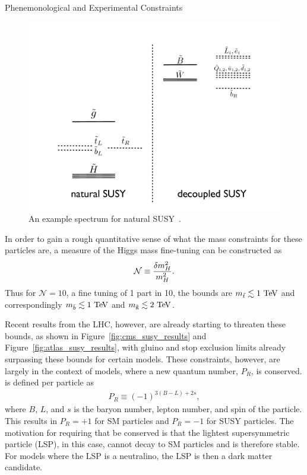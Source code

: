 \begin{section}{Phenemonological and Experimental Constraints}
\begin{figure}[tbp!]
\begin{center}
\includegraphics[angle=0,width=0.60\columnwidth]{fig/natural_susy_spectrum.png}
\end{center}
\caption{An example spectrum for natural SUSY~\cite{Papucci:2011wy}.}
\label{fig:natural_susy_spectrum}
\end{figure}

In order to gain a rough quantitative sense of what the mass constraints for these particles are, a measure of the Higgs mass fine-tuning can be constructed as
\begin{align}
\mathcal{N} \equiv \frac{\delta m_{H}^2}{m_{H}^2}.
\end{align}
Thus for $\mathcal{N} = 10$, a fine tuning of 1 part in 10, the bounds are $m_{\tilde{t}} \lesssim 1~\mathrm{Te\kern -0.1em V}$ and correspondingly $m_{\tilde{b}} \lesssim 1~\mathrm{Te\kern -0.1em V}$ and $m_{\tilde{\mathrm{g}}} \lesssim 2~\mathrm{Te\kern -0.1em V}$.

Recent results from the LHC, however, are already starting to threaten these bounds, as shown in Figure~\ref{fig:cms_susy_results} and Figure~\ref{fig:atlas_susy_results}, with gluino and stop exclusion limits already surpassing these bounds for certain models.
These constraints, however, are largely in the context of \RPC models, where a new quantum number, $P_R$, is conserved.
\RP is defined per particle as
\begin{align}
P_R \equiv (-1)^{3(B-L)+2s},
\end{align}
where $B$, $L$, and $s$ is the baryon number, lepton number, and spin of the particle.
This results in $P_R = +1$ for SM particles and $P_R = -1$ for SUSY particles.
The motivation for requiring that \RP be conserved is that the lightest supersymmetric particle (LSP), in this case, cannot decay to SM particles and is therefore stable.
For models where the LSP is a neutralino, the LSP is then a dark matter candidate.


\end{section}
